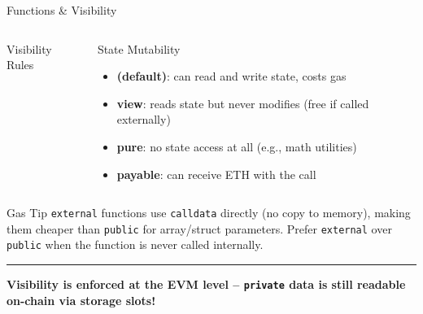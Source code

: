 \documentclass[8pt,aspectratio=169]{beamer}
\newcommand{\bottomnote}[1]{\vfill\vspace{-2mm}\textcolor{mllavender2}{\rule{\textwidth}{0.4pt}}\vspace{1mm}\footnotesize\textbf{#1}}
\begin{document}
\begin{frame}{Functions \& Visibility}
\begin{columns}
\begin{block}{Visibility Rules}
\end{block}
\begin{block}{State Mutability}
\begin{itemize}\small
  \item \textbf{(default)}: can read and write state, costs gas
  \item \textbf{view}: reads state but never modifies (free if called externally)
  \item \textbf{pure}: no state access at all (e.g., math utilities)
  \item \textbf{payable}: can receive ETH with the call
\end{itemize}
\end{block}
\end{columns}
\vspace{1mm}
\begin{alertblock}{Gas Tip}
\small \texttt{external} functions use \texttt{calldata} directly (no copy to memory), making them cheaper than \texttt{public} for array/struct parameters. Prefer \texttt{external} over \texttt{public} when the function is never called internally.
\end{alertblock}
\bottomnote{Visibility is enforced at the EVM level -- \texttt{private} data is still readable on-chain via storage slots!}
\end{frame}
\end{document}
